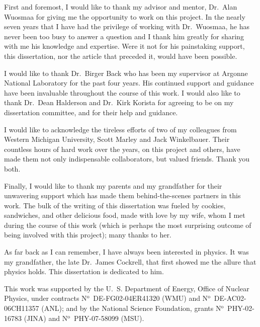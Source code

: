 First and foremost, I would like to thank my advisor and mentor, Dr.~Alan Wuosmaa for giving me the opportunity to work on this project.  In the nearly seven years that I have had the privilege of working with Dr.~Wuosmaa, he has never been too busy to answer a question and I thank him greatly for sharing with me his 
knowledge and expertise.  Were it not for his painstaking support, this dissertation, nor the article that preceded it, would have been possible.

I would like to thank Dr.~Birger Back who has been my supervisor at Argonne National Laboratory for the past four years.  His continued support and guidance have been invaluable throughout the course of this work.  I would also like to thank Dr.~Dean Halderson and Dr.~Kirk Korista for agreeing to be on my dissertation committee, and for their help and guidance.

I would like to %
acknowledge the tireless efforts of two of my colleagues from Western Michigan University, Scott Marley and Jack Winkelbauer.  Their countless hours of hard work over the years, on this project and others, have made them not only indispensable collaborators, but valued friends.  Thank you both.

Finally, I would like to thank %
my parents and my grandfather for their unwavering support which has made them behind-the-scenes partners in this work.  The bulk of the writing of this dissertation was fueled by cookies, sandwiches, and other delicious food, made with love by my wife, whom I met during the course of this work (which is perhaps the most surprising outcome of being involved with this project); many thanks to her.

As far back as I can remember, I have always been interested in physics.  It was my grandfather, the late Dr.~James Cockrell, that first showed me the allure that physics holds.  This dissertation is dedicated to him.



This work was supported by the U.\ S. Department of Energy,
Office of Nuclear Physics, under contracts N$^\textrm{o}$~DE-FG02-04ER41320 (WMU) 
and N$^\textrm{o}$~DE-AC02-06CH11357 (ANL); and by the National Science Foundation, grants N$^\textrm{o}$~PHY-02-16783  (JINA) and N$^\textrm{o}$~PHY-07-58099 (MSU). 